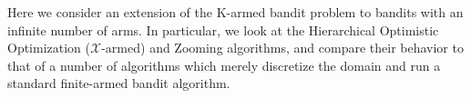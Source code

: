Here we consider an extension of the K-armed bandit problem to bandits with
an infinite number of arms.  In particular, we look at the Hierarchical
Optimistic Optimization ($\mathcal{X}$-armed)\cite{xarms08}
and Zooming \cite{kleinberg2008multi} algorithms, and
compare their behavior to that of a number of algorithms which merely
discretize the domain and run a standard finite-armed bandit algorithm.